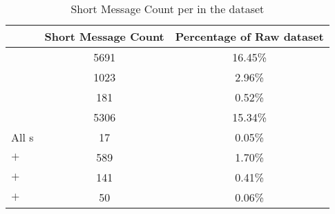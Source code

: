 
\begin{table}%
    \centering
    \begin{tabular}{|lcc|}
    \hline
    \textbf{\contentType{}} & \textbf{Short Message Count} & \textbf{Percentage of Raw dataset} \\ \hline
    \trafilaturaTitle{} & 5691 & 16.45\% \\
    \trafilaturaAbstract{} & 1023 & 2.96\% \\
    \trafilaturaFulltext{} & 181 & 0.52\% \\
    \translationTitle{} & 5306 & 15.34\% \\ \hline
    All \contentType{}s & 17 & 0.05\% \\
    \trafilaturaTitle{} $+$ \trafilaturaAbstract{}  & 589   & 1.70\% \\
    \trafilaturaTitle{} $+$ \trafilaturaFulltext{} & 141 & 0.41\% \\
    \trafilaturaFulltext{} $+$ \trafilaturaAbstract{}  & 50   & 0.06\% \\
    \hline
    \end{tabular}
    \caption{Short Message Count per \contentType{} in the \VSI{} dataset}
    \label{tab:05_vsi_short_document_count}
\end{table}